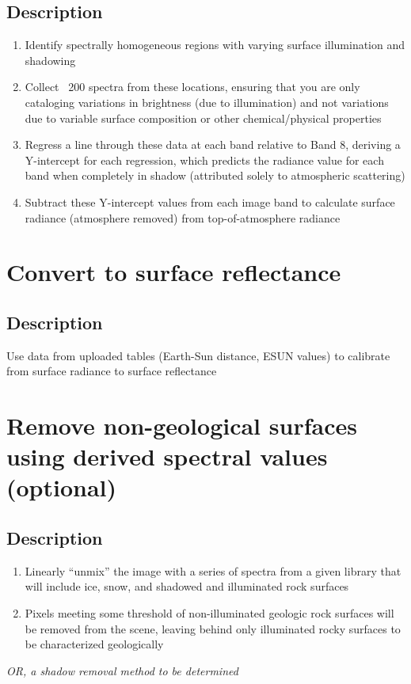 \documentclass{scrreprt}
\begin{document}
\subsection{Description}
\begin{enumerate}
	\item Identify spectrally homogeneous regions with varying surface illumination 
		and shadowing
	\item Collect ~200 spectra from these locations, ensuring that you are only 
		cataloging variations in brightness (due to illumination) and not variations 
		due to variable surface composition or other chemical/physical properties
	\item Regress a line through these data at each band relative to Band 8, deriving a 
		Y-intercept for each regression, which predicts the radiance value for each 
		band when completely in shadow (attributed solely to atmospheric scattering)
	\item Subtract these Y-intercept values from each image band to calculate surface 
		radiance (atmosphere removed) from top-of-atmosphere radiance
\end{enumerate}

\section{Convert to surface reflectance}
\subsection{Description}
Use data from uploaded tables (Earth-Sun distance, ESUN values) to calibrate from surface 
radiance to surface reflectance

\section{Remove non-geological surfaces using derived spectral values (optional)}
\subsection{Description}
\begin{enumerate}
	\item Linearly ``unmix'' the image with a series of spectra from a given library that 
		will include ice, snow, and shadowed and illuminated rock surfaces
	\item Pixels meeting some threshold of non-illuminated geologic rock surfaces will 
		be removed from the scene, leaving behind only illuminated rocky surfaces to be characterized geologically
\end{enumerate}
\textit{OR, a shadow removal method to be determined}
\end{document}
